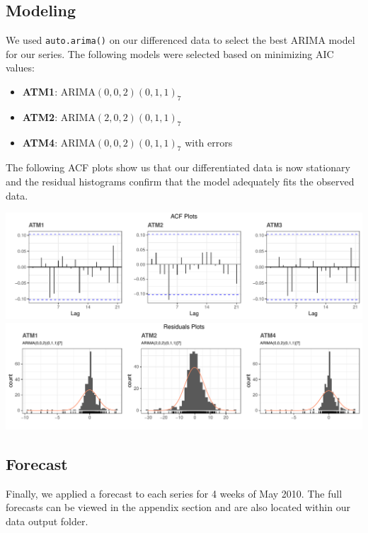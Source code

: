 \documentclass[openany]{book}
\providecommand{\tightlist}{%
  \setlength{\itemsep}{0pt}\setlength{\parskip}{0pt}}
\begin{document}
\hypertarget{modeling}{%
\subsection{Modeling}\label{modeling}}

We used \texttt{auto.arima()} on our differenced data to select the best
ARIMA model for our series. The following models were selected based on
minimizing AIC values:

\begin{itemize}
\tightlist
\item
  \textbf{ATM1}: ARIMA\((0,0,2)(0,1,1)_7\)
\item
  \textbf{ATM2}: ARIMA\((2,0,2)(0,1,1)_7\)
\item
  \textbf{ATM4}: ARIMA\((0,0,2)(0,1,1)_7\) with errors
\end{itemize}

The following ACF plots show us that our differentiated data is now
stationary and the residual histograms confirm that the model adequately
fits the observed data.

\includegraphics{Part-A-JM_files/figure-latex/unnamed-chunk-6-1.pdf}
\includegraphics{Part-A-JM_files/figure-latex/unnamed-chunk-6-2.pdf}

\hypertarget{forecast}{%
\subsection{Forecast}\label{forecast}}

Finally, we applied a forecast to each series for 4 weeks of May 2010.
The full forecasts can be viewed in the appendix section and are also
located within our data output folder.
\end{document}
